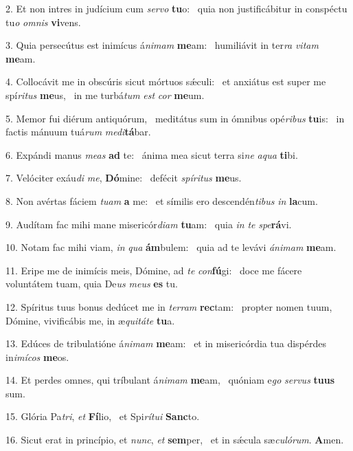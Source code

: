 2. Et non intres in judícium cum \textit{ser}\textit{vo} \textbf{tu}o: \ast\  quia non justificábitur in conspéctu tu\textit{o} \textit{om}\textit{nis} \textbf{vi}vens.\

3. Quia persecútus est inimícus á\textit{ni}\textit{mam} \textbf{me}am: \ast\  humiliávit in ter\textit{ra} \textit{vi}\textit{tam} \textbf{me}am.\

4. Collocávit me in obscúris sicut mórtuos sǽculi: \dag\  et anxiátus est super me spí\textit{ri}\textit{tus} \textbf{me}us, \ast\  in me turbá\textit{tum} \textit{est} \textit{cor} \textbf{me}um.\

5. Memor fui diérum antiquórum, \dag\  meditátus sum in ómnibus opé\textit{ri}\textit{bus} \textbf{tu}is: \ast\  in factis mánuum tuá\textit{rum} \textit{me}\textit{di}\textbf{tá}bar.\

6. Expándi manus \textit{me}\textit{as} \textbf{ad} te: \ast\  ánima mea sicut terra si\textit{ne} \textit{a}\textit{qua} \textbf{ti}bi.\

7. Velóciter exáu\textit{di} \textit{me}, \textbf{Dó}mine: \ast\  defécit \textit{spí}\textit{ri}\textit{tus} \textbf{me}us.\

8. Non avértas fáciem \textit{tu}\textit{am} \textbf{a} me: \ast\  et símilis ero descendén\textit{ti}\textit{bus} \textit{in} \textbf{la}cum.\

9. Audítam fac mihi mane misericór\textit{di}\textit{am} \textbf{tu}am: \ast\  quia \textit{in} \textit{te} \textit{spe}\textbf{rá}vi.\

10. Notam fac mihi viam, \textit{in} \textit{qua} \textbf{ám}bulem: \ast\  quia ad te levávi \textit{á}\textit{ni}\textit{mam} \textbf{me}am.\

11. Eripe me de inimícis meis, Dómine, ad \textit{te} \textit{con}\textbf{fú}gi: \ast\  doce me fácere voluntátem tuam, quia De\textit{us} \textit{me}\textit{us} \textbf{es} tu.\

12. Spíritus tuus bonus dedúcet me in \textit{ter}\textit{ram} \textbf{rec}tam: \ast\  propter nomen tuum, Dómine, vivificábis me, in æ\textit{qui}\textit{tá}\textit{te} \textbf{tu}a.\

13. Edúces de tribulatióne á\textit{ni}\textit{mam} \textbf{me}am: \ast\  et in misericórdia tua dispérdes in\textit{i}\textit{mí}\textit{cos} \textbf{me}os.\

14. Et perdes omnes, qui tríbulant á\textit{ni}\textit{mam} \textbf{me}am, \ast\  quóniam e\textit{go} \textit{ser}\textit{vus} \textbf{tu}\textbf{us} sum.\

15. Glória Pa\textit{tri}, \textit{et} \textbf{Fí}lio, \ast\  et Spi\textit{rí}\textit{tu}\textit{i} \textbf{Sanc}to.\

16. Sicut erat in princípio, et \textit{nunc}, \textit{et} \textbf{sem}per, \ast\  et in sǽcula sæ\textit{cu}\textit{ló}\textit{rum}. \textbf{A}men.\

